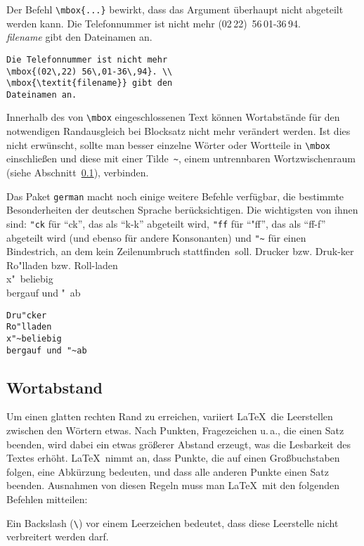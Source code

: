 Der Befehl \verb|\mbox{...}| bewirkt, dass das Argument überhaupt nicht
abgeteilt werden kann.
\exa
Die Telefonnummer ist nicht mehr
\mbox{(02\,22) 56\,01-36\,94}. \\
\mbox{\textit{filename}} gibt den 
Dateinamen an.
\exb 
\begin{verbatim}
Die Telefonnummer ist nicht mehr
\mbox{(02\,22) 56\,01-36\,94}. \\
\mbox{\textit{filename}} gibt den 
Dateinamen an.
\end{verbatim}
\exc
Innerhalb des von \verb|\mbox| eingeschlossenen Text können
Wortabstände für den notwendigen Randausgleich bei
Blocksatz nicht mehr verändert werden.  Ist dies nicht
erwünscht, sollte man besser einzelne Wörter oder Wortteile
in \verb|\mbox| einschließen und diese mit einer Tilde~\verb|~|,
einem untrennbaren Wortzwischenraum (siehe
Abschnitt~\ref{abstaende}), verbinden.


Das Paket \texttt{german} macht noch einige weitere Befehle
verfügbar, die bestimmte Besonderheiten der deutschen Sprache
berücksichtigen.  Die wichtigsten von ihnen sind:
\verb|"ck| für "`ck"', das als "`\mbox{k-k}"' abgeteilt wird,
\verb|"ff| für "`"ff"', das als "`\mbox{ff-f}"' abgeteilt wird
(und ebenso für andere Konsonanten)
und \verb|"~| für einen Bindestrich, an dem kein Zeilenumbruch
stattfinden~soll.
\exa
Drucker bzw. Druk-ker \\
Ro"lladen bzw. Roll-laden \\
x"~beliebig\\
bergauf und "~ab
\exb
\begin{verbatim}
Dru"cker
Ro"lladen
x"~beliebig
bergauf und "~ab
\end{verbatim}
\exc


\subsection{Wortabstand} \label{abstaende}
 
Um einen glatten rechten Rand zu erreichen, variiert \LaTeX\ die
Leerstellen zwischen den Wörtern etwas.
Nach Punkten, Fragezeichen u.\,a., die einen Satz beenden, wird
dabei ein etwas größerer Abstand erzeugt, was die Lesbarkeit
des Textes erhöht.
\LaTeX\ nimmt an, dass Punkte, die auf einen Großbuchstaben
folgen, eine Abkürzung bedeuten, und dass alle anderen Punkte
einen Satz beenden.
Ausnahmen von diesen Regeln muss man \LaTeX\ mit den folgenden
Befehlen mitteilen:

Ein Backslash (\verb:\:) vor einem Leerzeichen bedeutet, dass diese
Leerstelle nicht verbreitert werden darf.

